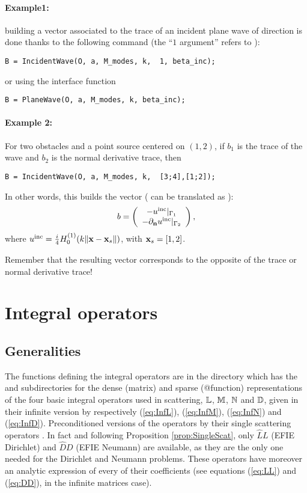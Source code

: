 \paragraph{Example1:} building a vector associated to the trace of an incident plane wave of direction  is done thanks to the following command (the ``$1$ argument'' refers to ):
\begin{verbatim}
B = IncidentWave(O, a, M_modes, k,  1, beta_inc);
\end{verbatim}
or using the interface function
\begin{verbatim}
B = PlaneWave(O, a, M_modes, k, beta_inc);
\end{verbatim}
\paragraph{Example 2:} For two obstacles and a point source centered on $(1,2)$, if $b_1$ is the trace of the wave and $b_2$ is the normal derivative trace, then
\begin{verbatim}
B = IncidentWave(O, a, M_modes, k,  [3;4],[1;2]);
\end{verbatim}
In other words, this builds the vector (\code{[3,4]} can be translated as ):
$$
b = \left(\begin{array}{c}
-u^{\textrm{inc}}|_{\Gamma_1}\\
-\partial_{\mathbf{n}}u^{\textrm{inc}}|_{\Gamma_2}\\
\end{array}\right),
$$
where $u^{\textrm{inc}} = \frac{i}{4}H_0^{(1)}(k\|{\mathbf{x}}-{\mathbf{x}}_s\|)$, with ${\mathbf{x}}_s = [1,2]$.
\begin{remark}
Remember that the resulting vector corresponds to the opposite of the trace or normal derivative trace!
\end{remark}


\section{Integral operators}

\subsection{Generalities}

The functions defining the integral operators are in the directory  which has the 
and  subdirectories for the dense (matrix) and sparse (@function) representations of the four basic integral operators used in scattering,
\ie ${\mathbb{L}}$, ${\mathbb{M}}$, ${\mathbb{N}}$ and ${\mathbb{D}}$, given in their infinite version by respectively (\ref{eq:InfL}), (\ref{eq:InfM}), (\ref{eq:InfN}) and (\ref{eq:InfD}). Preconditioned versions of the operators by their single scattering operators \cite{Thi14}. In fact and following Proposition \ref{prop:SingleScat}, only $\widehat{L}L$ (EFIE Dirichlet) and $\widehat{D}D$ (EFIE Neumann) are available, as they are the only one needed for the Dirichlet and Neumann problems. These operators have moreover an analytic expression of every of their coefficients (see equations (\ref{eq:LL}) and (\ref{eq:DD}), in the infinite matrices case).


